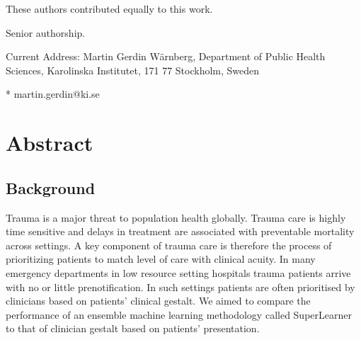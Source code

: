 \documentclass[10pt,letterpaper]{article}\usepackage[]{graphicx}\usepackage[]{color}
\begin{document}
\begin{flushleft}
% 
%
\Yinyang These authors contributed equally to this work.

\ddag Senior authorship.

\textcurrency Current Address: Martin Gerdin Wärnberg, Department of Public
Health Sciences, Karolinska Institutet, 171 77 Stockholm, Sweden




* martin.gerdin@ki.se

\end{flushleft}
\section*{Abstract}
\subsection*{Background}
Trauma is a major threat to population health globally. Trauma care is highly
time sensitive and delays in treatment are associated with preventable mortality
across settings. A key component of trauma care is therefore the process of
prioritizing patients to match level of care with clinical acuity. In many
emergency departments in low resource setting hospitals trauma patients arrive
with no or little prenotification. In such settings patients are often
prioritised by clinicians based on patients' clinical gestalt. We aimed to
compare the performance of an ensemble machine learning methodology called
SuperLearner to that of clinician gestalt based on patients’ presentation.
\end{document}
